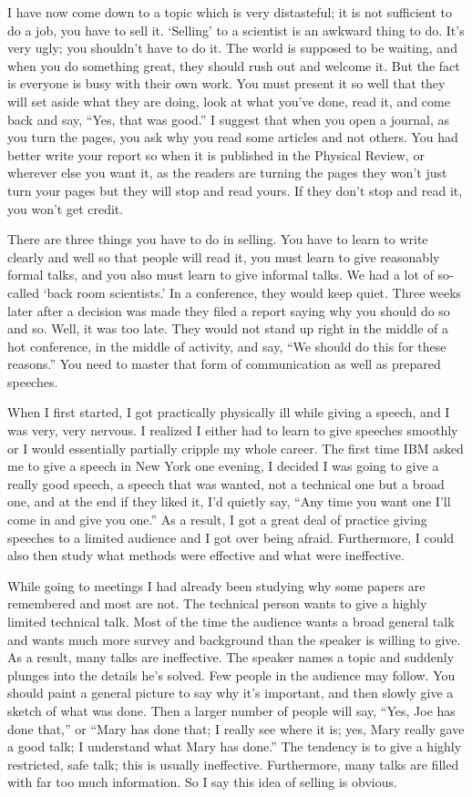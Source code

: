 \documentclass{article}
\begin{document}
I have now come down to a topic which is very distasteful; it is not sufficient to do a job, you have to sell it. `Selling' to a scientist is an awkward thing to do. It's very ugly; you shouldn't have to do it. The world is supposed to be waiting, and when you do something great, they should rush out and welcome it. But the fact is everyone is busy with their own work. You must present it so well that they will set aside what they are doing, look at what you've done, read it, and come back and say, ``Yes, that was good.'' I suggest that when you open a journal, as you turn the pages, you ask why you read some articles and not others. You had better write your report so when it is published in the Physical Review, or wherever else you want it, as the readers are turning the pages they won't just turn your pages but they will stop and read yours. If they don't stop and read it, you won't get credit.

There are three things you have to do in selling. You have to learn to write clearly and well so that people will read it, you must learn to give reasonably formal talks, and you also must learn to give informal talks. We had a lot of so-called `back room scientists.' In a conference, they would keep quiet. Three weeks later after a decision was made they filed a report saying why you should do so and so. Well, it was too late. They would not stand up right in the middle of a hot conference, in the middle of activity, and say, ``We should do this for these reasons.'' You need to master that form of communication as well as prepared speeches.

When I first started, I got practically physically ill while giving a speech, and I was very, very nervous. I realized I either had to learn to give speeches smoothly or I would essentially partially cripple my whole career. The first time IBM asked me to give a speech in New York one evening, I decided I was going to give a really good speech, a speech that was wanted, not a technical one but a broad one, and at the end if they liked it, I'd quietly say, ``Any time you want one I'll come in and give you one.'' As a result, I got a great deal of practice giving speeches to a limited audience and I got over being afraid. Furthermore, I could also then study what methods were effective and what were ineffective.

While going to meetings I had already been studying why some papers are remembered and most are not. The technical person wants to give a highly limited technical talk. Most of the time the audience wants a broad general talk and wants much more survey and background than the speaker is willing to give. As a result, many talks are ineffective. The speaker names a topic and suddenly plunges into the details he's solved. Few people in the audience may follow. You should paint a general picture to say why it's important, and then slowly give a sketch of what was done. Then a larger number of people will say, ``Yes, Joe has done that,'' or ``Mary has done that; I really see where it is; yes, Mary really gave a good talk; I understand what Mary has done.'' The tendency is to give a highly restricted, safe talk; this is usually ineffective. Furthermore, many talks are filled with far too much information. So I say this idea of selling is obvious.
\end{document}
